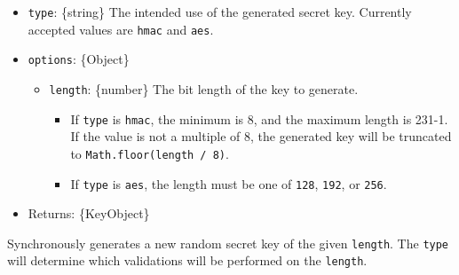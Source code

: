 \begin{itemize}
\tightlist
\item
  \texttt{type}: \{string\} The intended use of the generated secret
  key. Currently accepted values are
  \texttt{\textquotesingle{}hmac\textquotesingle{}} and
  \texttt{\textquotesingle{}aes\textquotesingle{}}.
\item
  \texttt{options}: \{Object\}

  \begin{itemize}
  \tightlist
  \item
    \texttt{length}: \{number\} The bit length of the key to generate.

    \begin{itemize}
    \tightlist
    \item
      If \texttt{type} is
      \texttt{\textquotesingle{}hmac\textquotesingle{}}, the minimum is
      8, and the maximum length is 231-1. If the value is not a multiple
      of 8, the generated key will be truncated to
      \texttt{Math.floor(length\ /\ 8)}.
    \item
      If \texttt{type} is
      \texttt{\textquotesingle{}aes\textquotesingle{}}, the length must
      be one of \texttt{128}, \texttt{192}, or \texttt{256}.
    \end{itemize}
  \end{itemize}
\item
  Returns: \{KeyObject\}
\end{itemize}

Synchronously generates a new random secret key of the given
\texttt{length}. The \texttt{type} will determine which validations will
be performed on the \texttt{length}.

\begin{Shaded}
\begin{Highlighting}[]
\NormalTok{ \{}
\OperatorTok{,}
\NormalTok{\} }\OperatorTok{=}  \NormalTok{(}\NormalTok{)}\OperatorTok{;}

\OperatorTok{=} \NormalTok{(}\OperatorTok{,}\NormalTok{ \{ }\OperatorTok{:} \NormalTok{ \})}\OperatorTok{;}
\NormalTok{()}\NormalTok{(}\NormalTok{))}\OperatorTok{;}  
\end{Highlighting}
\end{Shaded}

